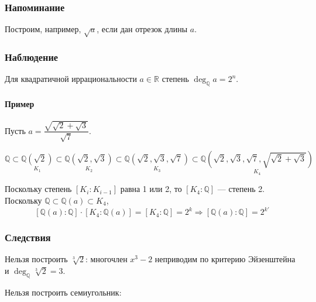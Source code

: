 \documentclass[a4paper]{article}
\newcommand{\R}{\ensuremath{\mathbb{R}}}
\newcommand{\Q}{\ensuremath{\mathbb{Q}}}
\numberwithin{theorem}{section}
\numberwithin{lemma}{section}
\numberwithin{proposition}{section}
\numberwithin{corollary}{section}
\begin{document}
\subsubsection*{Напоминание}
Построим, например, $\sqrt{a}$, если дан отрезок длины $a$.

\begin{figure}[h]
\centering
{}
\end{figure}

\subsubsection*{Наблюдение}
Для квадратичной иррациональности $a \in \R$
степень $\deg_\Q a = 2^n$.

\paragraph*{Пример}
Пусть $a = \dfrac{\sqrt{\sqrt{2}+\sqrt{3}}}{\sqrt{7}}$.

\[\Q \subset \underset{K_1}{\Q(\sqrt{2})} \subset \underset{K_2}{\Q(\sqrt{2},\sqrt{3})}
\subset \underset{K_3}{\Q(\sqrt{2},\sqrt{3},\sqrt{7})}
\subset \underset{K_4}{\Q(\sqrt{2},\sqrt{3},\sqrt{7}, \sqrt{\sqrt{2}+\sqrt{3}})}\]

Поскольку степень $[K_i : K_{i - 1}]$ равна 1 или 2, то $[K_4 : \Q]$ --- степень 2.
Поскольку $\Q \subset \Q(a) \subset K_4$,
\[[\Q(a) : \Q] \cdot [K_4 : \Q(a)] = [K_4 : \Q] = 2^k
\Rightarrow [\Q(a) : \Q] = 2^{k'}\]

\subsubsection*{Следствия}
Нельзя построить $\sqrt[3]{2}$: многочлен $x^3 - 2$ неприводим по критерию Эйзенштейна и $\deg_\Q \sqrt[3]{2} = 3$.

Нельзя построить семиугольник:
\end{document}
